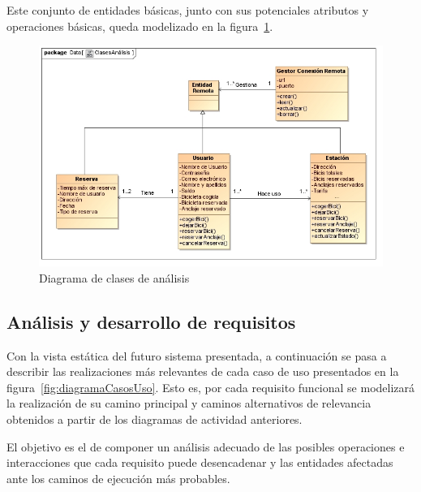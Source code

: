 Este conjunto de entidades básicas, junto con sus potenciales atributos y operaciones básicas, queda modelizado en la figura~\ref{fig:diagramaClasesAnalisis}.

\begin{figure}
	\centering
	\includegraphics[width=\linewidth,height=\textheight,keepaspectratio]{Images/Diagramas/03_ClasesAnalisis}
	\caption{Diagrama de clases de análisis}
	\label{fig:diagramaClasesAnalisis}
\end{figure}

\subsection{Análisis y desarrollo de requisitos}

Con la vista estática del futuro sistema presentada, a continuación se pasa a describir las realizaciones más relevantes de cada caso de uso presentados en la figura~\ref{fig:diagramaCasosUso}. Esto es, por cada requisito funcional se modelizará la realización de su camino principal y caminos alternativos de relevancia obtenidos a partir de los diagramas de actividad anteriores.

El objetivo es el de componer un análisis adecuado de las posibles operaciones e interacciones que cada requisito puede desencadenar y las entidades afectadas ante los caminos de ejecución más probables.

